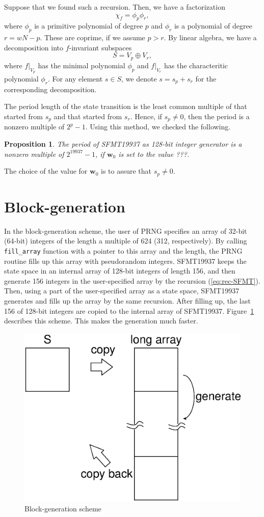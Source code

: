 \documentclass[acmnow]{acmtrans2m}
\newtheorem{proposition}[theorem]{Proposition}
\def\bw{{{\mathbf w}}}
\begin{document}
Suppose that we found such a recursion. Then, 
we have a factorization
$$
\chi_f=\phi_p \phi_r,
$$
where $\phi_p$ is a primitive polynomial of degree $p$
and $\phi_r$ is a polynomial of degree $r=wN-p$. These are coprime, 
if we assume $p>r$.
By linear algebra, we have a decomposition into $f$-invariant subspaces
$$
S=V_p \oplus V_r,
$$
where $f|_{V_p}$ has the minimal polynomial $\phi_p$
and $f|_{V_r}$ has the characteritic polynomial $\phi_r$.
For any element $s \in S$, we denote $s=s_p+s_r$ for the corresponding
decomposition. 

The period length of the state transition is the least common multiple
of that started from $s_p$ and that started from $s_r$. Hence, 
if $s_p \neq 0$, then the period is a nonzero multiple of $2^p-1$. 
Using this method, we checked the following. 
\begin{proposition}
The period of SFMT19937 as 128-bit integer generator is 
a nonzero multiple of $2^{19937}-1$, if $\bw_0$ is set to 
the value ???.
\end{proposition}
The choice of the value for $\bw_0$ is to assure that $s_p\neq 0$.

\section{Block-generation}\label{sec:block}
In the block-generation scheme, 
the user of PRNG specifies an array
of 32-bit (64-bit) integers of the length
a multiple of 624 (312, respectively).
By calling {\tt fill\_array} function 
with a pointer to this array and the length, 
the PRNG routine fills up this array with
pseudorandom integers. SFMT19937 keeps the state
space in an internal array of 128-bit integers of length 156,
and then generate 156 integers in the user-specified 
array by the recursion (\ref{eq:rec-SFMT}). 
Then, using a part of the user-specified array as a 
state space, SFMT19937 generates and fills up the array
by the same recursion. After filling up, the last
156 of 128-bit integers are copied to the internal array
of SFMT19937. Figure~\ref{fig:B1} describes this scheme.
This makes the generation much faster.

\begin{figure}
\begin{center}
\includegraphics[width=0.7\linewidth,height=0.7\textheight,
keepaspectratio]{fill_array.eps}
\end{center}
\caption{Block-generation scheme}
\label{fig:B1}
\end{figure}



\begin{received}
\end{received}
\end{document}
